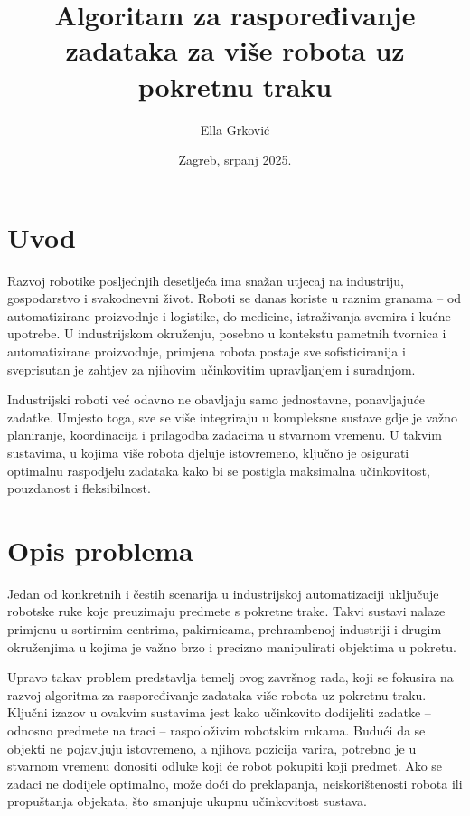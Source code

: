 \documentclass{fer}
\title{Algoritam za raspoređivanje zadataka za više robota uz pokretnu traku}
\author{Ella Grković}
\date{Zagreb, srpanj 2025.}
\begin{document}
\maketitle

\chapter{Uvod}

Razvoj robotike posljednjih desetljeća ima snažan utjecaj na industriju, gospodarstvo i svakodnevni život. Roboti se danas koriste u raznim granama – od automatizirane proizvodnje i logistike, do medicine, istraživanja svemira i kućne upotrebe. U industrijskom okruženju, posebno u kontekstu pametnih tvornica i automatizirane proizvodnje, primjena robota postaje sve sofisticiranija i sveprisutan je zahtjev za njihovim učinkovitim upravljanjem i suradnjom.

Industrijski roboti već odavno ne obavljaju samo jednostavne, ponavljajuće zadatke. Umjesto toga, sve se više integriraju u kompleksne sustave gdje je važno planiranje, koordinacija i prilagodba zadacima u stvarnom vremenu. U takvim sustavima, u kojima više robota djeluje istovremeno, ključno je osigurati optimalnu raspodjelu zadataka kako bi se postigla maksimalna učinkovitost, pouzdanost i fleksibilnost.

\chapter{Opis problema}

Jedan od konkretnih i čestih scenarija u industrijskoj automatizaciji uključuje robotske ruke koje preuzimaju predmete s pokretne trake. Takvi sustavi nalaze primjenu u sortirnim centrima, pakirnicama, prehrambenoj industriji i drugim okruženjima u kojima je važno brzo i precizno manipulirati objektima u pokretu.

Upravo takav problem predstavlja temelj ovog završnog rada, koji se fokusira na razvoj algoritma za raspoređivanje zadataka više robota uz pokretnu traku. Ključni izazov u ovakvim sustavima jest kako učinkovito dodijeliti zadatke – odnosno predmete na traci – raspoloživim robotskim rukama. Budući da se objekti ne pojavljuju istovremeno, a njihova pozicija varira, potrebno je u stvarnom vremenu donositi odluke koji će robot pokupiti koji predmet. Ako se zadaci ne dodijele optimalno, može doći do preklapanja, neiskorištenosti robota ili propuštanja objekata, što smanjuje ukupnu učinkovitost sustava.
\end{document}
